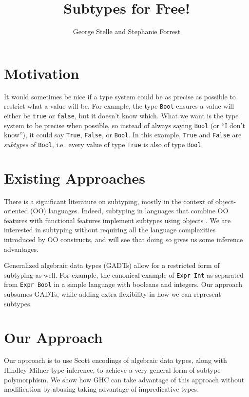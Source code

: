 \documentclass[]{article}
\title{Subtypes for Free!}
\author{George Stelle and Stephanie Forrest}
\date{}
\begin{document}
\maketitle

\section{Motivation}\label{motivation}

It would sometimes be nice if a type system could be as precise as
possible to restrict what a value will be. For example, the type
\texttt{Bool} ensures a value will either be \texttt{true} or
\texttt{false}, but it doesn't know which. What we want is the type
system to be precise when possible, so instead of always saying
\texttt{Bool} (or ``I don't know''), it could say \texttt{True},
\texttt{False}, or \texttt{Bool}. In this example, \texttt{True} and
\texttt{False} are \emph{subtypes} of \texttt{Bool}, i.e.~every value of
type \texttt{True} is also of type \texttt{Bool}.

\section{Existing Approaches}\label{existing-approaches}

There is a significant literature on subtyping, mostly in the context of
object-oriented (OO) languages. Indeed, subtyping in languages that
combine OO features with functional features implement subtypes using
objects \cite{scala, ocaml}. We are interested in subtyping without
requiring all the language complexities introduced by OO constructs, and
will see that doing so gives us some inference advantages.

Generalized algebraic data types (GADTs) allow for a restricted form of
subtyping as well. For example, the canonical example of
\texttt{Expr\ Int} as separated from \texttt{Expr\ Bool} in a simple
language with booleans and integers. Our approach subsumes GADTs, while
adding extra flexibility in how we can represent subtypes.

\section{Our Approach}\label{our-approach}

Our approach is to use Scott encodings of algebraic data types, along
with Hindley Milner type inference, to achieve a very general form of
subtype polymorphism. We show how GHC can take advantage of this
approach without modification by \sout{abusing} taking advantage of
impredicative types.
\end{document}
